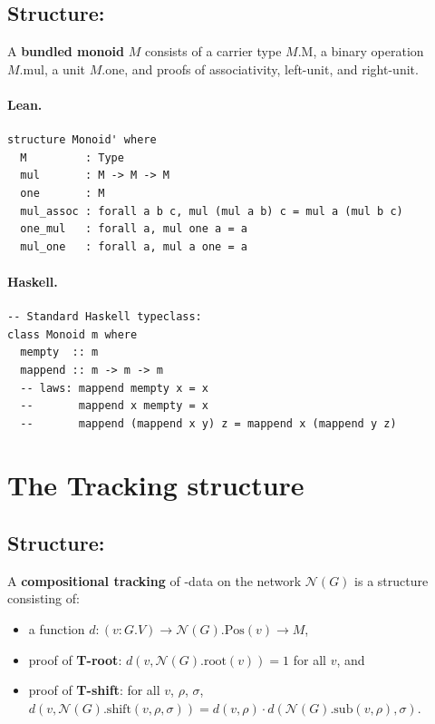 \documentclass[11pt,a4paper]{article}
\begin{document}
\subsection{Structure: }

\begin{defn}
A \textbf{bundled monoid} $M$ consists of a carrier type $M.\mathrm{M}$, a
binary operation $M.\mathrm{mul}$, a unit $M.\mathrm{one}$, and proofs of
associativity, left-unit, and right-unit.
\end{defn}

\paragraph{Lean.}
\begin{lstlisting}[style=lean]
structure Monoid' where
  M         : Type
  mul       : M -> M -> M
  one       : M
  mul_assoc : forall a b c, mul (mul a b) c = mul a (mul b c)
  one_mul   : forall a, mul one a = a
  mul_one   : forall a, mul a one = a
\end{lstlisting}

\paragraph{Haskell.}
\begin{lstlisting}[style=haskell]
-- Standard Haskell typeclass:
class Monoid m where
  mempty  :: m
  mappend :: m -> m -> m
  -- laws: mappend mempty x = x
  --       mappend x mempty = x
  --       mappend (mappend x y) z = mappend x (mappend y z)
\end{lstlisting}


\section{The Tracking structure}

\subsection{Structure: }

\begin{defn}
A \textbf{compositional tracking} of -data on the network
$\mathcal{N}(G)$ is a structure consisting of:
\begin{itemize}
  \item a function $d : (v : G.V) \to \mathcal{N}(G).\mathrm{Pos}(v) \to M$,
  \item proof of \textbf{T-root}: $d(v, \mathcal{N}(G).\mathrm{root}(v)) = 1$
    for all $v$, and
  \item proof of \textbf{T-shift}: for all $v$, $\rho$, $\sigma$,
    $d(v, \mathcal{N}(G).\mathrm{shift}(v, \rho, \sigma)) =
      d(v, \rho) \cdot d(\mathcal{N}(G).\mathrm{sub}(v, \rho), \sigma)$.
\end{itemize}
\end{defn}
\end{document}
